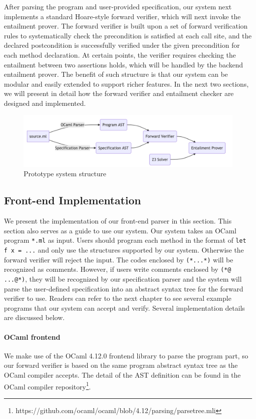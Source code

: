 After parsing the program and user-provided specification, our system next
implements a standard Hoare-style forward verifier, which will next invoke
the entailment prover. The forward verifier is built upon a set of forward
verification rules to systematically check the precondition is satisfied at
each call site, and the declared postcondition is successfully verified
under the given precondition for each method declaration. At certain points,
the verifier requires checking the entailment between two assertions holds, 
which will be handled by the backend entailment prover. The benefit of 
such structure is that our system can be modular and easily extended 
to support richer features. In the next two sections, we will present in 
detail how the forward verifier and entailment checker are designed
and implemented.

\begin{figure}
    \centering
    \includegraphics[width=0.8\linewidth]{report/pic/ch-Design/structure.png}
    \caption{Prototype system structure}
    \label{fig:structure}
\end{figure}

\subsection{Front-end Implementation}

We present the implementation of our front-end parser in this section. This section also serves as a guide to use our system. Our system takes an OCaml program \texttt{*.ml} as input. Users should program each method in the format of \texttt{let f x = ...} and only use the structures supported by our system. Otherwise the forward verifier will reject the input. The codes enclosed by \texttt{(*...*)} will be recognized as comments. However, if users write comments enclosed by \texttt{(*@ ...@*)}, they will be recognized by our specification parser and the system will parse the user-defined specification into an abstract syntax tree for the forward verifier to use. Readers can refer to the next chapter to see several example programs that our system can accept and verify. Several implementation details are discussed below.

\paragraph{OCaml frontend} We make use of the OCaml 4.12.0 frontend library to parse the program part, so our forward verifier is based on the same program abstract syntax tree as the OCaml compiler accepts. The detail of the AST definition can be found in the OCaml compiler repository\footnote{https://github.com/ocaml/ocaml/blob/4.12/parsing/parsetree.mli}.

